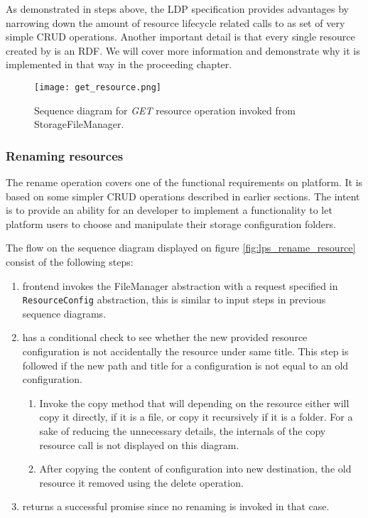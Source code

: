 As demonstrated in steps above, the LDP specification provides advantages by narrowing down the amount of resource lifecycle related calls to as set of very simple CRUD operations. Another important detail is that every single resource created by \lpas{} is an RDF. We will cover more information and demonstrate why it is implemented in that way in the proceeding chapter.  
 
\begin{figure}[h]
\centering
\texttt{[image: get\_resource.png]}
\caption{Sequence diagram for \textit{GET} resource operation invoked from StorageFileManager.}
\label{fig:lps_get_resource_sequence}
\end{figure}

\subsubsection{Renaming resources}

The rename operation covers one of the functional requirements on \lpa{} platform. It is based on some simpler CRUD operations described in earlier sections. The intent is to provide an ability for an \lpa{} developer to implement a functionality to let \lpa{} platform users to choose and manipulate their storage configuration folders. 

The flow on the sequence diagram displayed on figure \ref{fig:lps_rename_resource} consist of the following steps:

\begin{enumerate}
    \item \lpa{} frontend invokes the FileManager abstraction with a request specified in \texttt{ResourceConfig} abstraction, this is similar to input steps in previous sequence diagrams. 
    \item \lpas{} has a conditional check to see whether the new provided resource configuration is not accidentally the resource under same title. This step is followed if the new path and title for a configuration is not equal to an old configuration.
    	\begin{enumerate}
    	\item Invoke the copy method that will depending on the resource either will copy it directly, if it is a file, or copy it recursively if it is a folder. For a sake of reducing the unnecessary details, the internals of the copy resource call is not displayed on this diagram.
    	\item After copying the content of configuration into new destination, the old resource it removed using the delete operation.
    	\end{enumerate}
    \item \lpas{} returns a successful promise since no renaming is invoked in that case. 
\end{enumerate}

